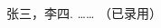 
\begin{achievements}

\begin{bibliolist}{00}
  \item 张三，李四. …… （已录用）
  
\end{bibliolist}


\end{achievements}
